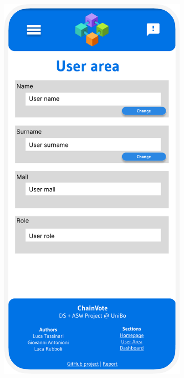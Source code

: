 \documentclass{scrartcl}
\begin{document}
\begin{figure}
    \begin{subfigure}[b]{0.3\textwidth}
        \centering
        \includegraphics[width=\textwidth]{./figures/mockups/user-area.pdf}

\end{subfigure}
\end{figure}
\end{document}

